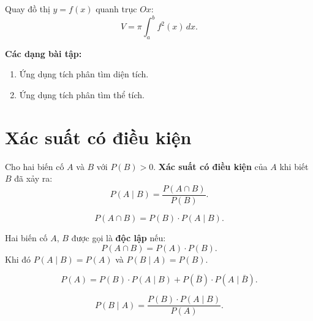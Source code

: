 \documentclass[12pt,a4paper]{article}
\begin{document}
\begin{congthuc}[title={Thể tích vật thể tròn xoay}]
  Quay đồ thị $y = f(x)$ quanh trục $Ox$:
  \[
    V = \pi \int_a^b f^2(x)\,dx.
  \]
\end{congthuc}

\medskip\noindent\textbf{Các dạng bài tập:}
\begin{enumerate}[label=\textbf{Dạng \arabic*:}, leftmargin=*, align=left]
  \item Ứng dụng tích phân tìm diện tích.
  \item Ứng dụng tích phân tìm thể tích.
\end{enumerate}

\newpage
\section{Xác suất có điều kiện}

\begin{dinhnghia}
  Cho hai biến cố $A$ và $B$ với $P(B) > 0$. \textbf{Xác suất có điều kiện} của $A$ khi biết $B$ đã xảy ra:
  \[
    P(A \mid B) = \frac{P(A \cap B)}{P(B)}.
  \]
\end{dinhnghia}

\begin{congthuc}[title={Công thức nhân}]
  \[
    P(A \cap B) = P(B) \cdot P(A \mid B).
  \]
\end{congthuc}

\begin{dinhnghia}[title={Biến cố độc lập}]
  Hai biến cố $A$, $B$ được gọi là \textbf{độc lập} nếu:
  \[
    P(A \cap B) = P(A) \cdot P(B).
  \]
  Khi đó $P(A \mid B) = P(A)$ và $P(B \mid A) = P(B)$.
\end{dinhnghia}

\begin{congthuc}[title={Xác suất toàn phần}]
  \[
    P(A) = P(B) \cdot P(A \mid B) + P(\bar{B}) \cdot P(A \mid \bar{B}).
  \]
\end{congthuc}

\begin{congthuc}[title={Công thức Bayes}]
  \[
    P(B \mid A) = \frac{P(B) \cdot P(A \mid B)}{P(A)}.
  \]
\end{congthuc}
\end{document}
